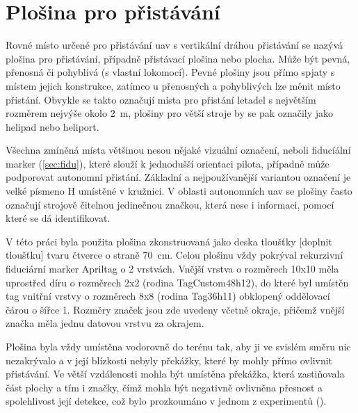 \chapter{Plošina pro přistávání} \label{chap:pad}
  Rovné místo určené pro přistávání \acrshort{uav} s vertikální dráhou přistávání se nazývá plošina pro přistávání, případně přistávací plošina nebo plocha. Může být pevná, přenosná či pohyblivá (s vlastní lokomocí). Pevné plošiny jsou přímo spjaty s místem jejich konstrukce, zatímco u přenosných a pohyblivých lze měnit místo přistání. Obvykle se takto označují místa pro přistání letadel s největším rozměrem nejvýše okolo 2~m, plošiny pro větší stroje by se pak označily jako helipad nebo heliport.

  Všechna zmíněná místa většinou nesou nějaké vizuální označení, neboli fiducíální marker (\cref{sec:fidu}), které slouží k jednodušší orientaci pilota, případně může podporovat autonomní přistání. Základní a nejpoužívanější variantou označení je velké písmeno H umístěné v kružnici. V oblasti autonomních \acrshort{uav} se plošiny často označují strojově čitelnou jedinečnou značkou, která nese i informaci, pomocí které se dá identifikovat.

  V této práci byla použita plošina zkonstruovaná jako deska tloušťky [doplnit tloušťku] tvaru čtverce o straně 70~cm. Celou plošinu vždy pokrýval rekurzivní fiduciární marker Apriltag o 2 vrstvách. Vnější vrstva o rozměrech 10x10 měla uprostřed díru o rozměrech 2x2 (rodina TagCustom48h12), do které byl umístěn tag vnitřní vrstvy o rozměrech 8x8 (rodina Tag36h11) obklopený oddělovací čárou o šířce 1. Rozměry značek jsou zde uvedeny včetně okraje, přičemž vnější značka měla jednu datovou vrstvu za okrajem.
  
  Plošina byla vždy umístěna vodorovně do terénu tak, aby ji ve svislém směru nic nezakrývalo a v její blízkosti nebyly překážky, které by mohly přímo ovlivnit přistávání. Ve větší vzdálenosti mohla být umístěna překážka, která zastiňovala část plochy a tím i značky, čímž mohla být negativně ovlivněna přesnost a spolehlivost její detekce, což bylo prozkoumáno v jednom z experimentů ().
